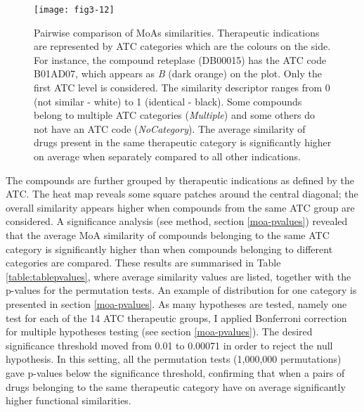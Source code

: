 \begin{figure}[H]
    \centering
    \texttt{[image: fig3-12]}
    \caption{Pairwise comparison of MoAs similarities. Therapeutic indications are represented by ATC categories which are the colours on the side. For instance, the compound reteplase (DB00015) has the ATC code B01AD07, 
which appears as \emph{B} (dark orange) on the plot. Only the first ATC level is considered. The similarity descriptor ranges from 0 (not similar - white) to 1 (identical - black). Some compounds belong to multiple ATC categories (\emph{Multiple}) and some others do not have an ATC code (\emph{NoCategory}). The average similarity of drugs present in the same therapeutic category is significantly higher on average when separately compared to all other indications.}
    \label{fig3-12}
\end{figure}

The compounds are further grouped by therapeutic indications as defined by the ATC. The heat map reveals some square patches around the central diagonal; the overall similarity appears higher when compounds from the same ATC group are considered.
A significance analysis (see method, section \ref{moa-pvalues}) revealed that the average MoA similarity of compounds belonging to the same ATC category is significantly higher than when compounds belonging to different categories are compared. These results are summarised in Table \ref{table:tablepvalues}, where average similarity values are listed, together with the p-values for the permutation tests. An example of distribution for one category is presented in section \ref{moa-pvalues}.
As many hypotheses are tested, namely one test for each of the 14 ATC therapeutic groups, I applied Bonferroni correction for multiple hypotheses testing (see section \ref{moa-pvalues}). The desired significance threshold moved from 0.01 to 0.00071 in order to reject the null hypothesis. In this setting, all the permutation tests (1,000,000 permutations) gave p-values below the significance threshold, confirming that when a pairs of drugs belonging to the same therapeutic category have on average significantly higher functional similarities.

